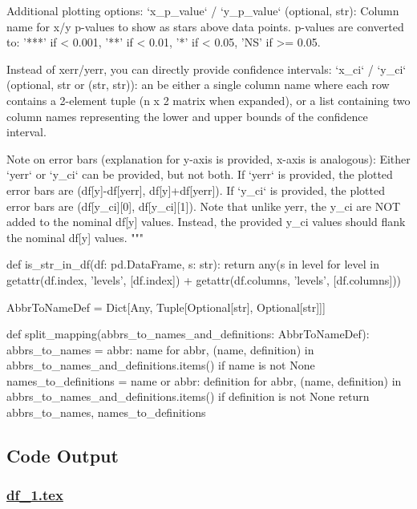 \documentclass[11pt]{article}
\begin{document}
\begin{python}
    Additional plotting options:
    `x_p_value` / `y_p_value` (optional, str): Column name for x/y p-values to show as stars above data points.
        p-values are converted to: '***' if < 0.001, '**' if < 0.01, '*' if < 0.05, 'NS' if >= 0.05.

    Instead of xerr/yerr, you can directly provide confidence intervals:
    `x_ci` / `y_ci` (optional, str or (str, str)): an be either a single column name where each row contains
        a 2-element tuple (n x 2 matrix when expanded), or a list containing two column names 
        representing the lower and upper bounds of the confidence interval.

    Note on error bars (explanation for y-axis is provided, x-axis is analogous):
    Either `yerr` or `y_ci` can be provided, but not both.
    If `yerr` is provided, the plotted error bars are (df[y]-df[yerr], df[y]+df[yerr]).
    If `y_ci` is provided, the plotted error bars are (df[y_ci][0], df[y_ci][1]).
    Note that unlike yerr, the y_ci are NOT added to the nominal df[y] values. 
    Instead, the provided y_ci values should flank the nominal df[y] values.
    """

def is_str_in_df(df: pd.DataFrame, s: str):
    return any(s in level for level in getattr(df.index, 'levels', [df.index]) + getattr(df.columns, 'levels', [df.columns]))

AbbrToNameDef = Dict[Any, Tuple[Optional[str], Optional[str]]]

def split_mapping(abbrs_to_names_and_definitions: AbbrToNameDef):
    abbrs_to_names = {abbr: name for abbr, (name, definition) in abbrs_to_names_and_definitions.items() if name is not None}
    names_to_definitions = {name or abbr: definition for abbr, (name, definition) in abbrs_to_names_and_definitions.items() if definition is not None}
    return abbrs_to_names, names_to_definitions

\end{python}



\subsection{Code Output}

\subsubsection*{\hyperlink{code-LaTeX Table Design-df-1-tex}{df\_1.tex}}
\end{document}
